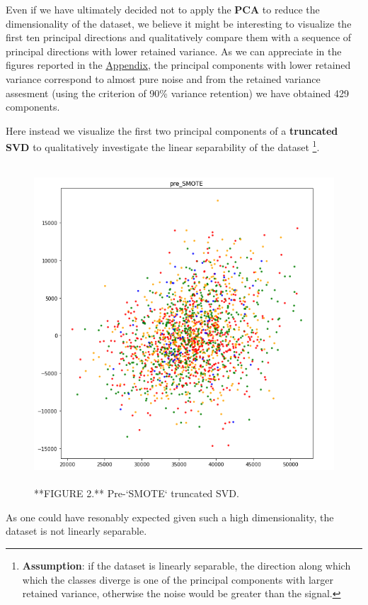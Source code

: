 \documentclass{acm_proc_article-sp}
\begin{document}
Even if we have ultimately decided not to apply the \textbf{PCA} to
reduce the dimensionality of the dataset, we believe it might be
interesting to visualize the first ten principal directions and
qualitatively compare them with a sequence of principal directions with
lower retained variance. As we can appreciate in the figures reported in
the \protect\hyperlink{pca}{Appendix}, the principal components with
lower retained variance correspond to almost pure noise and from the
retained variance assesment (using the criterion of 90\% variance
retention) we have obtained 429 components.

Here instead we visualize the first two principal components of a
\textbf{truncated SVD} to qualitatively investigate the linear
separability of the dataset \footnote{\textbf{Assumption}: if the
  dataset is linearly separable, the direction along which which the
  classes diverge is one of the principal components with larger
  retained variance, otherwise the noise would be greater than the
  signal.}.

\begin{figure}

{\centering \includegraphics[width=450px,height=450]{Images/TruncatedSVD_preSMOTE} 

}

\caption{**FIGURE 2.** Pre-`SMOTE` truncated SVD.}\label{fig:pre-smote}
\end{figure}

As one could have resonably expected given such a high dimensionality,
the dataset is not linearly separable.
\end{document}
